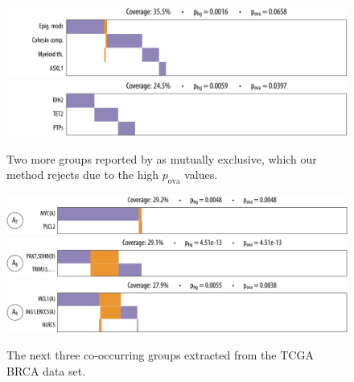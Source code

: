 \begin{figure}[htbp]
\centering
\includegraphics[width=\textwidth]{figures/genes/aml_comet1.pdf}\\[2em]
\includegraphics[width=\textwidth]{figures/genes/aml_comet2.pdf}\\[2em]
\caption{Two more groups reported by \comet{} as mutually exclusive, which our method rejects due to the high $p_{\textrm{ova}}$ values.}
\label{fig:comet_aml}
\end{figure}
\vspace{3em}
\begin{figure}[htbp]
\centering
\includegraphics[width=\textwidth]{figures/genes/brca_9_a.pdf}\\[1.2em]
\includegraphics[width=\textwidth]{figures/genes/brca_13_a.pdf}\\[1.2em]
\includegraphics[width=\textwidth]{figures/genes/brca_5_a.pdf}\\[1.2em]
\caption{The next three co-occurring groups extracted from the TCGA BRCA data set.}
\label{fig:att_brca_2}
\end{figure}

